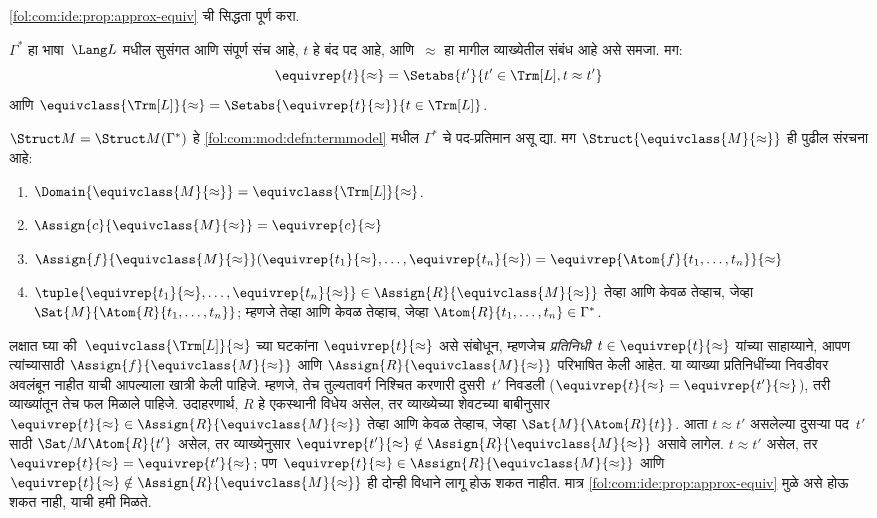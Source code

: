 \begin{prob}
\ref{fol:com:ide:prop:approx-equiv} ची सिद्धता पूर्ण करा.
\end{prob}

\begin{defn}
$\Gamma^*$ हा भाषा~$\Lang L$ मधील सुसंगत आणि संपूर्ण संच आहे,
$t$ हे बंद पद आहे, आणि~$\approx$ हा मागील व्याख्येतील संबंध आहे असे
समजा. मग:
\[\equivrep{t}{\approx} = \Setabs{t'}{t'\in \Trm[L], t \approx t'}
\]
आणि $\equivclass{\Trm[L]}{\approx} = \Setabs{\equivrep{t}{\approx}}{t \in \Trm[L]}$.
\end{defn}

\begin{defn}
\label{fol:com:ide:defn:term-model-factor}
$\Struct M = \Struct M(\Gamma^*)$ हे \ref{fol:com:mod:defn:termmodel} मधील
$\Gamma^*$ चे पद-प्रतिमान असू द्या. मग
$\Struct{\equivclass{M}{\approx}}$ ही पुढील संरचना आहे:
\begin{enumerate}
\item $\Domain{\equivclass{M}{\approx}} = \equivclass{\Trm[L]}{\approx}$.
\item $\Assign{c}{\equivclass{M}{\approx}} = \equivrep{c}{\approx}$
\item $\Assign{f}{\equivclass{M}{\approx}}(\equivrep{t_1}{\approx}, \dots,
  \equivrep{t_n}{\approx}) = \equivrep{\Atom{f}{t_1,\dots, t_n}}{\approx}$
\item $\tuple{\equivrep{t_1}{\approx}, \dots, \equivrep{t_n}{\approx}} \in
  \Assign{R}{\equivclass{M}{\approx}}$ तेव्हा आणि केवळ तेव्हाच, जेव्हा
  $\Sat{M}{\Atom{R}{t_1,\dots, t_n}}$; म्हणजे तेव्हा आणि केवळ तेव्हाच,
  जेव्हा $\Atom{R}{t_1,\dots, t_n} \in \Gamma^*$.
\end{enumerate}
\end{defn}

\begin{explain}
लक्षात घ्या की~$\equivclass{\Trm[L]}{\approx}$ च्या घटकांना
$\equivrep{t}{\approx}$ असे संबोधून, म्हणजेच
\emph{प्रतिनिधी}~$t \in \equivrep{t}{\approx}$ यांच्या साहाय्याने,
आपण त्यांच्यासाठी $\Assign{f}{\equivclass{M}{\approx}}$ आणि
$\Assign{R}{\equivclass{M}{\approx}}$ परिभाषित केली आहेत. या व्याख्या
प्रतिनिधींच्या निवडीवर अवलंबून नाहीत याची आपल्याला खात्री केली पाहिजे.
म्हणजे, तेच तुल्यतावर्ग निश्चित करणारी दुसरी~$t'$ निवडली
($\equivrep{t}{\approx} = \equivrep{t'}{\approx}$), तरी व्याख्यांतून तेच
फल मिळाले पाहिजे. उदाहरणार्थ, $R$ हे एकस्थानी विधेय असेल, तर
व्याख्येच्या शेवटच्या बाबीनुसार $\equivrep{t}{\approx} \in
\Assign{R}{\equivclass{M}{\approx}}$ तेव्हा आणि केवळ तेव्हाच, जेव्हा
$\Sat{M}{\Atom{R}{t}}$. आता $t \approx t'$ असलेल्या दुसऱ्या
पद~$t'$ साठी $\Sat/{M}{\Atom{R}{t'}}$ असेल, तर व्याख्येनुसार
$\equivrep{t'}{\approx} \notin \Assign{R}{\equivclass{M}{\approx}}$ असावे
लागेल. $t \approx t'$ असेल, तर $\equivrep{t}{\approx} =
\equivrep{t'}{\approx}$; पण $\equivrep{t}{\approx} \in
\Assign{R}{\equivclass{M}{\approx}}$ आणि $\equivrep{t}{\approx}
\notin \Assign{R}{\equivclass{M}{\approx}}$ ही दोन्ही विधाने लागू होऊ
शकत नाहीत. मात्र \ref{fol:com:ide:prop:approx-equiv} मुळे असे होऊ शकत नाही, याची
हमी मिळते.

\end{explain}

